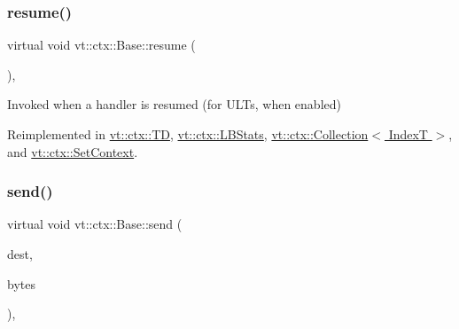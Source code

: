 \mbox{\label{structvt_1_1ctx_1_1_base_a303afabb40ed83057fbe30c744db95da}} 
\subsubsection{\texorpdfstring{resume()}{resume()}}
{\footnotesize\ttfamily virtual void vt\+::ctx\+::\+Base\+::resume (\begin{DoxyParamCaption}{ }\end{DoxyParamCaption})\hspace{0.3cm}{\ttfamily [inline]}, {\ttfamily [virtual]}}



Invoked when a handler is resumed (for U\+L\+Ts, when enabled) 



Reimplemented in \hyperlink{structvt_1_1ctx_1_1_t_d_aa21b5afe01312244e338eefecde83bc6}{vt\+::ctx\+::\+TD}, \hyperlink{structvt_1_1ctx_1_1_l_b_stats_a099850f1bd53aafe650ed9e3958ca54b}{vt\+::ctx\+::\+L\+B\+Stats}, \hyperlink{structvt_1_1ctx_1_1_collection_a4cf87cf7d38bd8d4706ffda41e31c9c6}{vt\+::ctx\+::\+Collection$<$ Index\+T $>$}, and \hyperlink{structvt_1_1ctx_1_1_set_context_a5d0e979f3d601900223d0db9bb8992d3}{vt\+::ctx\+::\+Set\+Context}.

\mbox{\label{structvt_1_1ctx_1_1_base_a8b641dd9a36fc6b60a6ac35e0126076d}} 
\subsubsection{\texorpdfstring{send()}{send()}}
{\footnotesize\ttfamily virtual void vt\+::ctx\+::\+Base\+::send (\begin{DoxyParamCaption}\item[{\hyperlink{structvt_1_1elm_1_1_element_i_d_struct}{elm\+::\+Element\+I\+D\+Struct}}]{dest,  }\item[{\hyperlink{namespacevt_a408e86a8c7c89309b52907dc5a513924}{Msg\+Size\+Type}}]{bytes }\end{DoxyParamCaption})\hspace{0.3cm}{\ttfamily [inline]}, {\ttfamily [virtual]}}



